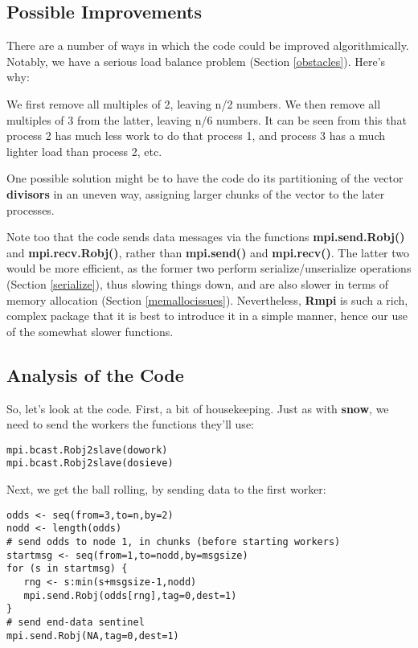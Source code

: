 \subsection{Possible Improvements}

There are a number of ways in which the code could be improved
algorithmically.  Notably, we have a serious load balance problem
(Section \ref{obstacles}).  Here's why:

We first remove all multiples of 2, leaving n/2 numbers.  We then remove
all multiples of 3 from the latter, leaving n/6 numbers.  It can be seen
from this that process 2 has much less work to do that process 1, and
process 3 has a much lighter load than process 2, etc.

One possible solution might be to have the code do its partitioning of
the vector {\bf divisors} in an uneven way, assigning larger chunks of
the vector to the later processes.

Note too that the code sends data messages via the functions {\bf
mpi.send.Robj()} and {\bf mpi.recv.Robj()}, rather than {\bf mpi.send()}
and {\bf mpi.recv()}.  The latter two would be more efficient, as the
former two perform serialize/unserialize operations (Section
\ref{serialize}), thus slowing things down, and are also slower in
terms of memory allocation (Section \ref{memallocissues}).  Nevertheless,
{\bf Rmpi} is such a rich, complex package that it is best to introduce
it in a simple manner, hence our use of the somewhat slower functions.

\subsection{Analysis of the Code}
\label{primecode}

So, let's look at the code.  First, a bit of housekeeping.  Just as with
{\bf snow}, we need to send the workers the functions they'll use:

\begin{lstlisting}
mpi.bcast.Robj2slave(dowork)
mpi.bcast.Robj2slave(dosieve)
\end{lstlisting}

Next, we get the ball rolling, by sending data to the first worker:

\begin{lstlisting}
odds <- seq(from=3,to=n,by=2)
nodd <- length(odds)
# send odds to node 1, in chunks (before starting workers)
startmsg <- seq(from=1,to=nodd,by=msgsize)
for (s in startmsg) {
   rng <- s:min(s+msgsize-1,nodd)
   mpi.send.Robj(odds[rng],tag=0,dest=1)
}
# send end-data sentinel
mpi.send.Robj(NA,tag=0,dest=1)
\end{lstlisting}

